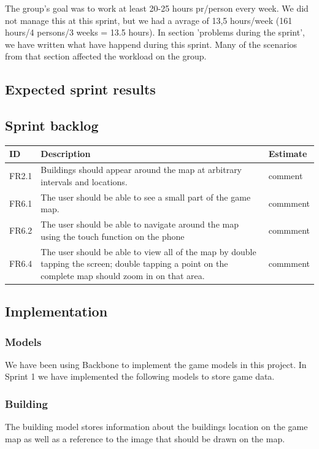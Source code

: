 	The group's goal was to work at least 20-25 hours pr/person every week. We did not manage this at this sprint, but we had a avrage of 13,5 hours/week (161 hours/4 persons/3 weeks = 13.5 hours). 
	In section 'problems during the sprint', we have written what have happend during this sprint.
	Many of the scenarios from that section affected the workload on the group. 

\subsection{Expected sprint results}


\subsection{Sprint backlog}
\begin{tabular}{| p{1cm} | p{8cm} | p{3cm} |}
	\hline
	\rowcolor{gray}
	ID & Description & Estimate \\ \hline
	FR2.1 & Buildings should appear around the map at arbitrary intervals and locations. & comment \\ \hline
	FR6.1 & The user should be able to see a small part of the game map. & commment \\ \hline
	FR6.2 & The user should be able to navigate around the map using the touch function on the phone & commment \\ \hline
	FR6.4 & The user should be able to view all of the map by double tapping the screen; double tapping a point on the complete map should zoom in on that area. & commment \\
	\hline
\end{tabular}

\subsection{Implementation}

\subsubsection*{Models}
We have been using Backbone to implement the game models in this project. In Sprint 1 we have implemented 
the following models to store game data.
	\subsubsection*{Building}
	The building model stores information about the buildings location on the game map as well as a reference 
	to the image that should be drawn on the map.
